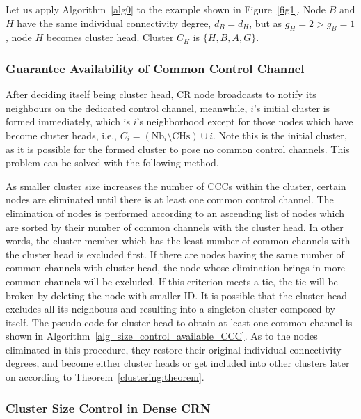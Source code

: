 \documentclass[10pt,journal,compsoc]{IEEEtran}
\theoremstyle{mytheoremstyle}
\theoremstyle{mytheoremstyle}
\theoremstyle{mytheoremstyle}
\newcommand{\ie}{i.e., }
\begin{document}
Let us apply Algorithm~\ref{alg0} to the example shown in Figure~\ref{fig1}.
Node $B$ and $H$ have the same individual connectivity degree, $d_B=d_H$, but as $g_H=2>g_B=1$, node $H$ becomes cluster head.
Cluster $C_H$ is $\{H, B, A, G\}$.
	




\subsubsection{Guarantee Availability of Common Control Channel}
After deciding itself being cluster head, CR node broadcasts to notify its neighbours on the dedicated control channel, meanwhile, $i$'s initial cluster is formed immediately, which is $i$'s neighborhood except for those nodes which have become cluster heads, \ie $C_i=(\text{Nb}_i\setminus \text{CHs})\cup i$.
Note this is the initial cluster, as it is possible for the formed cluster to pose no common control channels.
This problem can be solved with the following method.

As smaller cluster size increases the number of CCCs within the cluster, certain nodes are eliminated until there is at least one common control channel.
The elimination of nodes is performed according to an ascending list of nodes which are sorted by their number of common channels with the cluster head. 
In other words, the cluster member which has the least number of common channels with the cluster head is excluded first.
If there are nodes having the same number of common channels with cluster head, the node whose elimination brings in more common channels will be excluded.
If this criterion meets a tie, the tie will be broken by deleting the node with smaller ID.
It is possible that the cluster head excludes all its neighbours and resulting into a singleton cluster composed by itself.
The pseudo code for cluster head to obtain at least one common channel is shown in Algorithm~\ref{alg_size_control_available_CCC}.
As to the nodes eliminated in this procedure, they restore their original individual connectivity degrees, and become either cluster heads or get included into other clusters later on according to Theorem~\ref{clustering:theorem}.




\subsubsection{Cluster Size Control in Dense CRN}
\label{cluster_pruning}
\end{document}
